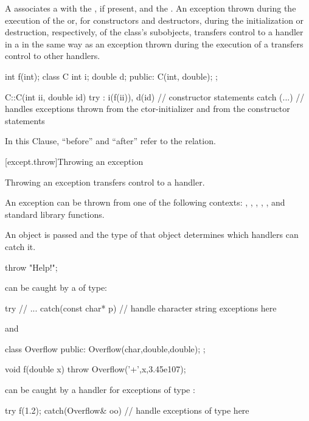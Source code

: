 \pnum
{}%
%
A
associates a
with the
,
if present, and the
.
An exception
thrown during the execution of the
or, for constructors and destructors, during the initialization or
destruction, respectively, of the class's subobjects,
transfers control to a handler in a
in the same way as an exception thrown during the execution of a
transfers control to other handlers.
\begin{example}
\begin{codeblock}
int f(int);
class C {
  int i;
  double d;
public:
  C(int, double);
};

C::C(int ii, double id)
try : i(f(ii)), d(id) {
    // constructor statements
} catch (...) {
    // handles exceptions thrown from the ctor-initializer and from the constructor statements
}
\end{codeblock}
\end{example}

\pnum
In this Clause, ``before'' and ``after'' refer to the
 relation.

[except.throw]{Throwing an exception}%
%

\pnum
Throwing an exception transfers control to a handler.
\begin{note}
An exception can be thrown from one of the following contexts:
,
,
,
,
, and standard library
functions.
\end{note}
An object is passed and the type of that object determines which handlers
can catch it.
\begin{example}
\begin{codeblock}
throw "Help!";
\end{codeblock}
can be caught by a
of
type:
\begin{codeblock}
try {
    // ...
} catch(const char* p) {
    // handle character string exceptions here
}
\end{codeblock}
and
\begin{codeblock}
class Overflow {
public:
    Overflow(char,double,double);
};

void f(double x) {
    throw Overflow('+',x,3.45e107);
}
\end{codeblock}
can be caught by a handler for exceptions of type
:
\begin{codeblock}
try {
    f(1.2);
} catch(Overflow& oo) {
    // handle exceptions of type  here
}
\end{codeblock}
\end{example}

